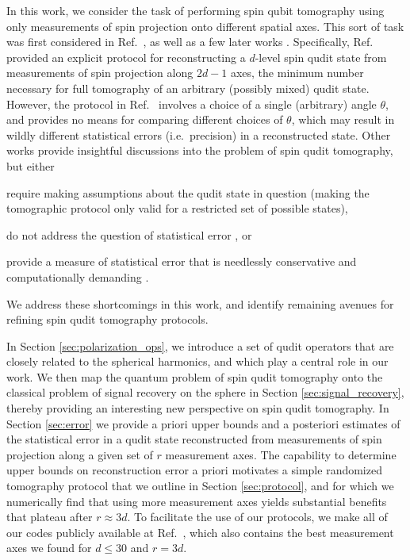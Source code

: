 \documentclass[nofootinbib,twocolumn]{revtex4-1}
\begin{document}
In this work, we consider the task of performing spin qubit tomography using only measurements of spin projection onto different spatial axes.
This sort of task was first considered in Ref.~\cite{newton1968measurability}, as well as a few later works \cite{hofmann2004quantumstate, filippov2010inverse, schmied2011tomographic}.
Specifically, Ref.~\cite{newton1968measurability} provided an explicit protocol for reconstructing a $d$-level spin qudit state from measurements of spin projection along $2d-1$ axes, the minimum number necessary for full tomography of an arbitrary (possibly mixed) qudit state.
However, the protocol in Ref.~\cite{newton1968measurability} involves a choice of a single (arbitrary) angle $\theta$, and provides no means for comparing different choices of $\theta$, which may result in wildly different statistical errors (i.e.~precision) in a reconstructed state.
Other works provide insightful discussions into the problem of spin qudit tomography, but either
\begin{enumerate*}
\item require making assumptions about the qudit state in question \cite{schmied2011tomographic} (making the tomographic protocol only valid for a restricted set of possible states),
\item do not address the question of statistical error \cite{hofmann2004quantumstate}, or
\item provide a measure of statistical error that is needlessly conservative and computationally demanding \cite{filippov2010inverse}.
\end{enumerate*}
We address these shortcomings in this work, and identify remaining avenues for refining spin qudit tomography protocols.

In Section \ref{sec:polarization_ops}, we introduce a set of qudit operators that are closely related to the spherical harmonics, and which play a central role in our work.
We then map the quantum problem of spin qudit tomography onto the classical problem of signal recovery on the sphere in Section \ref{sec:signal_recovery}, thereby providing an interesting new perspective on spin qudit tomography.
In Section \ref{sec:error} we provide a priori upper bounds and a posteriori estimates of the statistical error in a qudit state reconstructed from measurements of spin projection along a given set of $r$ measurement axes.
The capability to determine upper bounds on reconstruction error a priori motivates a simple randomized tomography protocol that we outline in Section \ref{sec:protocol}, and for which we numerically find that using more measurement axes yields substantial benefits that plateau after $r\approx3d$.
To facilitate the use of our protocols, we make all of our codes publicly available at Ref.~\cite{tomo_codes}, which also contains the best measurement axes we found for $d\le30$ and $r=3d$.
\end{document}
